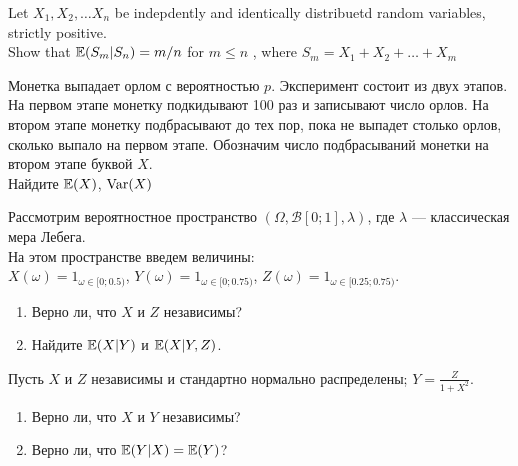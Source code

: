 \begin{problem}
Let $X_1, X_2, \ldots X_n$ be indepdently and identically distribuetd random variables, strictly positive. \\
Show that $\mathbb{E}(S_{m}|S_{n})= m/n$ for $m\le n$ , where $S_{m} = X_{1} + X_{2} + \ldots + X_{m}$

\begin{sol}

\end{sol}
\end{problem}

\begin{problem}
Монетка выпадает орлом с вероятностью $p$. Эксперимент состоит из двух этапов. На первом этапе монетку подкидывают 100 раз и записывают число орлов. На втором этапе монетку подбрасывают до тех пор, пока не выпадет столько орлов, сколько выпало на первом этапе. Обозначим число подбрасываний монетки на втором этапе буквой $X$. \\
Найдите $\mathbb{E}(X)$, $\operatorname{Var}(X)$

\begin{sol}

\end{sol}
\end{problem}

\begin{problem}
Рассмотрим вероятностное пространство
$(\Omega, \mathcal{B}[0;1], \lambda)$, где $\lambda$ — классическая
мера Лебега.\\
На этом пространстве введем величины: \\
$X(\omega)=1_{\omega\in[0;0.5)}$,
$Y(\omega)=1_{\omega\in[0;0.75)}$,
$Z(\omega)=1_{\omega\in[0.25;0.75)}$.
\begin{enumerate}
\item  Верно ли, что $X$ и $Z$ независимы?
\item Найдите $\mathbb{E}(X|Y)$ и $\mathbb{E}(X|Y,Z)$.
\end{enumerate}

\begin{sol}

\end{sol}
\end{problem}

\begin{problem}
Пусть $X$ и $Z$ независимы и стандартно нормально распределены;
$Y=\frac{Z}{1+X^{2}}$.
\begin{enumerate}
\item  Верно ли, что $X$ и $Y$ независимы?
\item Верно ли, что $\mathbb{E}(Y|X)=\mathbb{E}(Y)$?
\end{enumerate}

\begin{sol}

\end{sol}
\end{problem}

